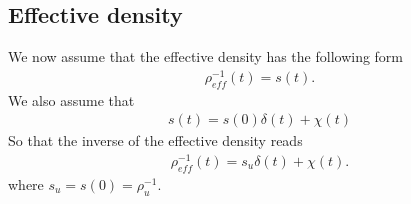 \documentclass[11pt]{article}
\begin{document}
\subsection*{Effective density} 
We now assume that the effective density has the following form
\begin{eqnarray}
 \rho^{-1}_{eff}(t) = s(t).
\end{eqnarray}
We also assume that 
\begin{eqnarray}
 s(t) = s(0)\delta(t)+\chi(t)
\end{eqnarray}
So that the inverse of the effective density reads
\begin{eqnarray}
 \rho^{-1}_{eff}(t) = s_u\delta(t)+\chi(t).
\end{eqnarray}
where $s_u = s(0)=\rho^{-1}_u$.
\end{document}
